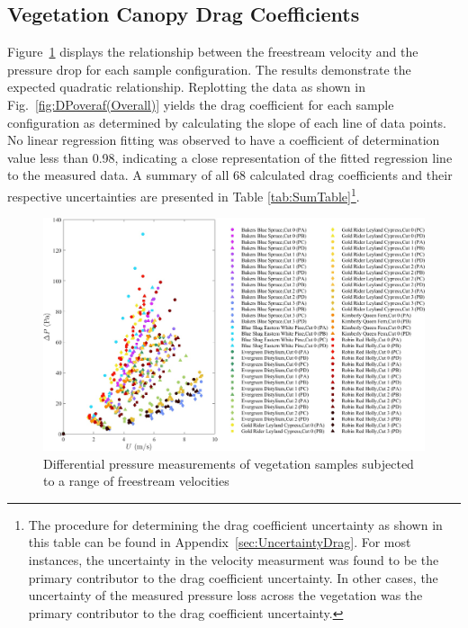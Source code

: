 \documentclass[12pt]{article}
\begin{document}
\pagebreak


\subsection{Vegetation Canopy Drag Coefficients}
\label{ssec:headingscap}

Figure~\ref{fig:DPvU(Overall)} displays the relationship between the freestream velocity and the pressure drop for each sample configuration. The results demonstrate the expected quadratic relationship. Replotting the data as shown in Fig.~\ref{fig:DPoveraf(Overall)} yields the drag coefficient for each sample configuration as determined by calculating the slope of each line of data points. No linear regression fitting was observed to have a coefficient of determination value less than 0.98, indicating a close representation of the fitted regression line to the measured data. A summary of all 68 calculated drag coefficients and their respective uncertainties are presented in Table \ref{tab:SumTable}\footnote{The procedure for determining the drag coefficient uncertainty as shown in this table can be found in Appendix~\ref{sec:UncertaintyDrag}. For most instances, the uncertainty in the velocity measurment was found to be the primary contributor to the drag coefficient uncertainty. In other cases, the uncertainty of the measured pressure loss across the vegetation was the primary contributor to the drag coefficient uncertainty.}.

\begin{figure} [!]
	\centering
	\includegraphics[width=\textwidth,keepaspectratio]{Picture8.jpg}
	\caption[Differential pressure measurements of vegetation samples]{Differential pressure measurements of vegetation samples subjected to a range of freestream velocities}
	\label{fig:DPvU(Overall)}
\end{figure}
\end{document}
